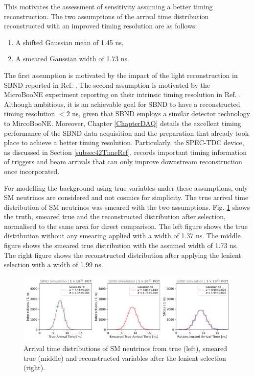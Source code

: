 This motivates the assessment of sensitivity assuming a better timing reconstruction.
The two assumptions of the arrival time distribution reconstructed with an improved timing resolution are as follows:
\begin{enumerate}
    \item A shifted Gaussian mean of 1.45 ns,
    \item A smeared Gaussian width of 1.73 ns.
\end{enumerate}
The first assumption is motivated by the impact of the light reconstruction in SBND reported in Ref. \cite{sbnd_pds_paper}.
The second assumption is motivated by the MicroBooNE experiment reporting on their intrinsic timing resolution in Ref. \cite{uboone_ns}.
Although ambitious, it is an achievable goal for SBND to have a reconstructed timing resolution $< 2$ ns, given that SBND employs a similar detector technology to MircoBooNE.
Moreover, Chapter \ref{ChapterDAQ} details the excellent timing performance of the SBND data acquisition and the preparation that already took place to achieve a better timing resolution.
Particularly, the SPEC-TDC device, as discussed in Section \ref{subsec42TimeRef}, records important timing information of triggers and beam arrivals that can only improve downstream reconstruction once incorporated. 

For modelling the background using true variables under these assumptions, only SM neutrinos are considered and not cosmics for simplicity. 
The true arrival time distribution of SM neutrinos was smeared with the two assumptions.
Fig. \ref{fig:gaus_truth_smear} shows the truth, smeared true and the reconstructed distribution after selection, normalised to the same area for direct comparison.
The left figure shows the true distribution without any smearing applied with a width of 1.37 ns.
The middle figure shows the smeared true distribution with the assumed width of 1.73 ns.
The right figure shows the reconstructed distribution after applying the lenient selection with a width of 1.99 ns.

\begin{figure}[ht!]
    \centering
    \includegraphics[width=\textwidth]{truth_smear_reco_gaus.png}
    \caption[Arrival Time of SM Neutrinos with an Improved Timing Resolution]{Arrival time distributions of SM neutrinos from true (left), smeared true (middle) and reconstructed variables after the lenient selection (right).}
    \label{fig:gaus_truth_smear}
\end{figure}


